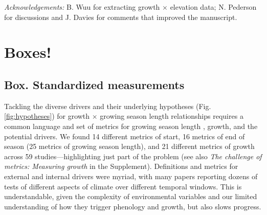 \documentclass[11pt]{article}
\begin{document}
\emph{Acknowledgements:} B. Wuu for extracting growth $\times$ elevation data; N. Pederson for discussions and J. Davies for comments that improved the manuscript. 

\newpage
\section{Boxes!}
\subsection*{Box. Standardized measurements} %

Tackling the diverse drivers and their underlying hypotheses (Fig. \ref{fig:hypotheses}) for growth $\times$ growing season length relationships requires a common language and set of metrics for growing season length \citep{korner2023four}, growth, and the potential drivers. We found 14 different metrics of start, 16 metrics of end of season (25 metrics of growing season length), and 21 different metrics of growth across 59 studies---highlighting just part of the problem (see also \emph{The challenge of metrics: Measuring growth} in the Supplement). Definitions and metrics for external and internal drivers were myriad, %
with many papers reporting dozens of tests of different aspects of climate over different temporal windows. This is understandable, given the complexity of environmental variables and our limited understanding of how they trigger phenology and growth, but also slows progress. 
\end{document}
